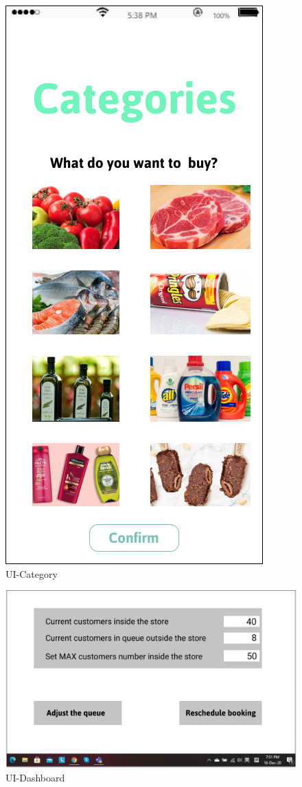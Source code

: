 \documentclass[a4paper,12pt]{report}
\begin{document}
\begin{figure}[H] 
	\centering  
	\includegraphics[scale=0.5]{UI-Category.png}
	\caption{UI-Category}
	\centering
	\label{UI-Category}
\end{figure}

\begin{figure}[H] 
	\centering  
	\includegraphics[scale=0.4]{UI-Dashboard.png}
	\caption{UI-Dashboard}
	\centering
	\label{UI-Dashboard}
\end{figure}
\end{document}

